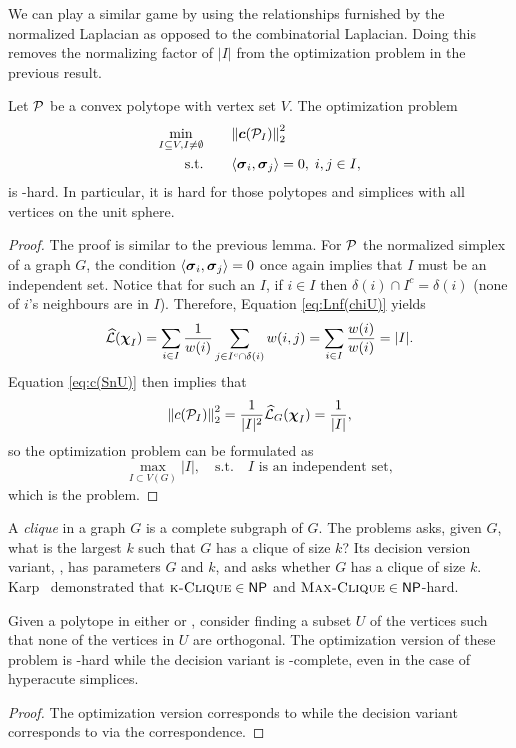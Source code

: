 We can play a similar game by using the relationships furnished by the normalized Laplacian as opposed to the combinatorial Laplacian. Doing this removes the normalizing factor of $|I|$ from the optimization problem in the previous result.  

\begin{lemma}
	Let $\P$ be a convex polytope with vertex set $V$. The optimization problem
	\begin{alignat*}{2}
	\min_{I\subset V, I\neq \emptyset} & \quad &&  {\norm{\cent(\P_I)}_2^2} \\
	\text{s.t.}&  &&  \la \sv_i,\sv_j\ra=0,\; i,j\in I,
	\end{alignat*}
	is \NP-hard. In particular, it is hard for those polytopes and simplices with all vertices on the unit sphere. 
\end{lemma}
\begin{proof}
	The proof is similar to the previous lemma. For $\P$ the normalized simplex of a graph $G$, the condition $\la \sv_i,\sv_j\ra=0$ once again implies that $I$ must be an independent set. Notice that for such an $I$, if $i\in I$ then $\delta(i) \cap I^c = \delta(i)$ (none of $i$'s neighbours are in $I$). Therefore, Equation \eqref{eq:Lnf(chiU)} yields 
	\begin{align*}
	\Lnf(\bchi_I)=\sum_{i\in I}\frac{1}{w(i)}\sum_{j\in I^c\cap \delta(i)} w(i,j) = \sum_{i\in I}\frac{w(i)}{w(i)} = |I|.
	\end{align*}
	Equation \eqref{eq:c(SnU)} then implies that 
	\[\norm{c(\P_I)}_2^2=\frac{1}{|I|^2}\Lnf_G(\bchi_I)=\frac{1}{|I|},\]
	so the optimization problem can be formulated as 
	\[\max_{I\subset V(G)} |I|,\quad  \text{s.t.} \quad I \text{ is an independent set},\]
	which is the \iset problem. 
\end{proof}

A \emph{clique} in a graph $G$ is a complete subgraph of $G$. The \maxclique problems asks, given  $G$, what is the  largest  $k$ such that $G$ has a clique of size $k$? Its decision version variant, \kclique, has parameters $G$ and $k$, and asks whether $G$ has a clique of size $k$. Karp~\cite{karp1972reducibility} demonstrated that $\kclique\in\NP$ and $\maxclique\in\NP$-hard.  

\begin{lemma}
	Given a polytope in either  \vdesc or \hdesc, consider finding a subset $U$ of the vertices such that none of the vertices in $U$ are orthogonal. The optimization version  of these problem is \NP-hard  while the  decision variant is \NP-complete, even in the case of hyperacute simplices. 
\end{lemma}
\begin{proof}
	The optimization version corresponds to \maxclique while the decision variant corresponds to \kclique via the correspondence.   
\end{proof}



